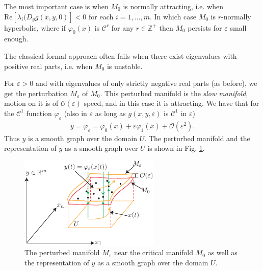 The most important case is when $M_0$ is normally attracting, i.e. when \newline $ \textrm{Re} [\lambda_i(D_{y}g(x,y,0) ] < 0$ for each $i=1,\ldots, m$.  In which case $M_0$ is $r$-normally hyperbolic, where if $\varphi_0(x)$ is $\mathcal{C}^{r}$ for any $r\in \mathbb{Z}^{+}$ then $M_0$ persists for $\varepsilon$ small enough. 

The classical formal approach often fails when there exist eigenvalues with positive real parts, i.e. when $M_0$ is unstable.

For $\varepsilon>0$ and with eigenvalues of only strictly negative real parts (as before), we get the perturbation $M_\varepsilon$ of $M_0$. This perturbed manifold is the \emph{slow manifold}, motion on it is of $\mathcal{O}(\varepsilon)$ speed, and in this case it is attracting. We have that for the $\mathcal{C}^{1}$ function $\varphi_{\varepsilon}$ (also in $\varepsilon$ as long as $g(x,y,\varepsilon)$ is $\mathcal{C}^{1}$ in $\varepsilon$)
\begin{align}
	y = \varphi_{\varepsilon}= \varphi_0(x) + \varepsilon \varphi_1(x) + \mathcal{O}(\varepsilon^{2}).
\end{align}
Thus $y$ is a smooth graph over the domain $U$. The perturbed manifold and the representation of $y$ as a smooth graph over $U$ is shown in Fig. \ref{fig:singular_perturbed_mfd}.
\begin{figure}[h!]
	\centering
	\includegraphics[width=0.6\textwidth]{figures/ch9/18singular_pert_mfd.pdf}
	\caption{The perturbed manifold $M_{\varepsilon}$ near the critical manifold $M_0$ as well as the representation of $y$ as a smooth graph over the domain $U$.}
	\label{fig:singular_perturbed_mfd}
\end{figure}

